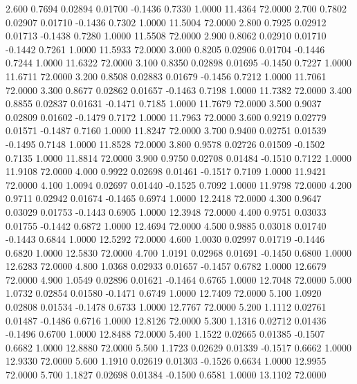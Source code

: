    2.600   0.7694   0.02894   0.01700  -0.1436   0.7330   1.0000  11.4364  72.0000
   2.700   0.7802   0.02907   0.01710  -0.1436   0.7302   1.0000  11.5004  72.0000
   2.800   0.7925   0.02912   0.01713  -0.1438   0.7280   1.0000  11.5508  72.0000
   2.900   0.8062   0.02910   0.01710  -0.1442   0.7261   1.0000  11.5933  72.0000
   3.000   0.8205   0.02906   0.01704  -0.1446   0.7244   1.0000  11.6322  72.0000
   3.100   0.8350   0.02898   0.01695  -0.1450   0.7227   1.0000  11.6711  72.0000
   3.200   0.8508   0.02883   0.01679  -0.1456   0.7212   1.0000  11.7061  72.0000
   3.300   0.8677   0.02862   0.01657  -0.1463   0.7198   1.0000  11.7382  72.0000
   3.400   0.8855   0.02837   0.01631  -0.1471   0.7185   1.0000  11.7679  72.0000
   3.500   0.9037   0.02809   0.01602  -0.1479   0.7172   1.0000  11.7963  72.0000
   3.600   0.9219   0.02779   0.01571  -0.1487   0.7160   1.0000  11.8247  72.0000
   3.700   0.9400   0.02751   0.01539  -0.1495   0.7148   1.0000  11.8528  72.0000
   3.800   0.9578   0.02726   0.01509  -0.1502   0.7135   1.0000  11.8814  72.0000
   3.900   0.9750   0.02708   0.01484  -0.1510   0.7122   1.0000  11.9108  72.0000
   4.000   0.9922   0.02698   0.01461  -0.1517   0.7109   1.0000  11.9421  72.0000
   4.100   1.0094   0.02697   0.01440  -0.1525   0.7092   1.0000  11.9798  72.0000
   4.200   0.9711   0.02942   0.01674  -0.1465   0.6974   1.0000  12.2418  72.0000
   4.300   0.9647   0.03029   0.01753  -0.1443   0.6905   1.0000  12.3948  72.0000
   4.400   0.9751   0.03033   0.01755  -0.1442   0.6872   1.0000  12.4694  72.0000
   4.500   0.9885   0.03018   0.01740  -0.1443   0.6844   1.0000  12.5292  72.0000
   4.600   1.0030   0.02997   0.01719  -0.1446   0.6820   1.0000  12.5830  72.0000
   4.700   1.0191   0.02968   0.01691  -0.1450   0.6800   1.0000  12.6283  72.0000
   4.800   1.0368   0.02933   0.01657  -0.1457   0.6782   1.0000  12.6679  72.0000
   4.900   1.0549   0.02896   0.01621  -0.1464   0.6765   1.0000  12.7048  72.0000
   5.000   1.0732   0.02854   0.01580  -0.1471   0.6749   1.0000  12.7409  72.0000
   5.100   1.0920   0.02808   0.01534  -0.1478   0.6733   1.0000  12.7767  72.0000
   5.200   1.1112   0.02761   0.01487  -0.1486   0.6716   1.0000  12.8126  72.0000
   5.300   1.1316   0.02712   0.01436  -0.1496   0.6700   1.0000  12.8488  72.0000
   5.400   1.1522   0.02665   0.01385  -0.1507   0.6682   1.0000  12.8880  72.0000
   5.500   1.1723   0.02629   0.01339  -0.1517   0.6662   1.0000  12.9330  72.0000
   5.600   1.1910   0.02619   0.01303  -0.1526   0.6634   1.0000  12.9955  72.0000
   5.700   1.1827   0.02698   0.01384  -0.1500   0.6581   1.0000  13.1102  72.0000
